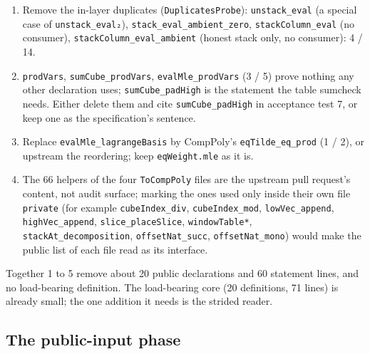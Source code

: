 \begin{enumerate}
\item Remove the in-layer duplicates (\texttt{DuplicatesProbe}): \texttt{unstack\_\allowbreak{}eval} (a special case of \texttt{unstack\_\allowbreak{}eval₂}), \texttt{stack\_\allowbreak{}eval\_\allowbreak{}ambient\_\allowbreak{}zero}, \texttt{stackColumn\_\allowbreak{}eval} (no consumer), \texttt{stackColumn\_\allowbreak{}eval\_\allowbreak{}ambient} (honest stack only, no consumer): 4 / 14.
\item \texttt{prodVars}, \texttt{sumCube\_\allowbreak{}prodVars}, \texttt{evalMle\_\allowbreak{}prodVars} (3 / 5) prove nothing any other declaration uses; \texttt{sumCube\_\allowbreak{}padHigh} is the statement the table sumcheck needs. Either delete them and cite \texttt{sumCube\_\allowbreak{}padHigh} in acceptance test 7, or keep one as the specification's sentence.
\item Replace \texttt{evalMle\_\allowbreak{}lagrangeBasis} by CompPoly's \texttt{eqTilde\_\allowbreak{}eq\_\allowbreak{}prod} (1 / 2), or upstream the reordering; keep \texttt{eqWeight.\allowbreak{}mle} as it is.
\item The 66 helpers of the four \texttt{ToCompPoly} files are the upstream pull request's content, not audit surface; marking the ones used only inside their own file \texttt{private} (for example \texttt{cubeIndex\_\allowbreak{}div}, \texttt{cubeIndex\_\allowbreak{}mod}, \texttt{lowVec\_\allowbreak{}append}, \texttt{highVec\_\allowbreak{}append}, \texttt{slice\_\allowbreak{}placeSlice}, \texttt{windowTable*}, \texttt{stackAt\_\allowbreak{}decomposition}, \texttt{offsetNat\_\allowbreak{}succ}, \texttt{offsetNat\_\allowbreak{}mono}) would make the public list of each file read as its interface.
\end{enumerate}

Together 1 to 5 remove about 20 public declarations and 60 statement lines, and no load-bearing definition. The load-bearing core (20 definitions, 71 lines) is already small; the one addition it needs is the strided reader.

\subsection{The public-input phase}\label{sec:gen-surface-pubinput}

\par{}\par

